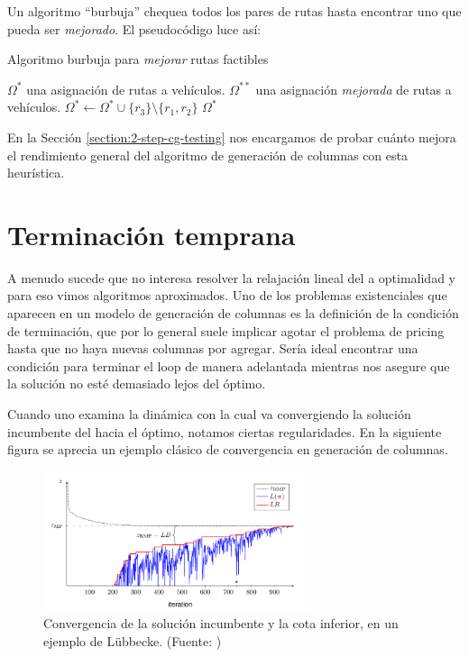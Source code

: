 Un algoritmo ``burbuja'' chequea todos los pares de rutas hasta encontrar uno que pueda ser \emph{mejorado}. El pseudocódigo luce así:

\begin{algorithm}[H]
  \caption{Algoritmo burbuja para \emph{mejorar} rutas factibles}
  \label{al:bubble-algorithm}
  \begin{algorithmic}[1]
  	\Require $\Omega^{*}$ una asignación de rutas a vehículos. 
  	\Ensure $\Omega^{**}$ una asignación \emph{mejorada} de rutas a vehículos. 
            \State $\Omega^{*} \gets \Omega^{*} \cup \{r_3\} \setminus \{r_1, r_2\}$
        \EndWhile
	\Return $\Omega^{*}$
  \end{algorithmic}
\end{algorithm}

En la Sección \ref{section:2-step-cg-testing} nos encargamos de probar cuánto mejora el rendimiento general del algoritmo de generación de columnas con esta heurística.

\section{Terminación temprana}
\label{section:finish-early}

A menudo sucede que no interesa resolver la relajación lineal del  a optimalidad y para eso vimos algoritmos aproximados. Uno de los problemas existenciales que aparecen en un modelo de generación de columnas es la definición de la condición de terminación, que por lo general suele implicar agotar el problema de pricing hasta que no haya nuevas columnas por agregar. Sería ideal encontrar una condición para terminar el loop de manera adelantada mientras nos asegure que la solución no esté demasiado lejos del óptimo.

Cuando uno examina la dinámica con la cual va convergiendo la solución incumbente del  hacia el óptimo, notamos ciertas regularidades. En la siguiente figura se aprecia un ejemplo clásico de convergencia en generación de columnas. 

\begin{figure}[H]
\centering
\includegraphics[width=0.7\textwidth]{img/Screenshot from 2023-10-11 00-03-23.png}
\caption{Convergencia de la solución incumbente y la cota inferior, en un ejemplo de Lübbecke. (Fuente: \cite{co-at-work-luebbecke})}
\label{fig:bound-convergence}
\centering
\end{figure}

